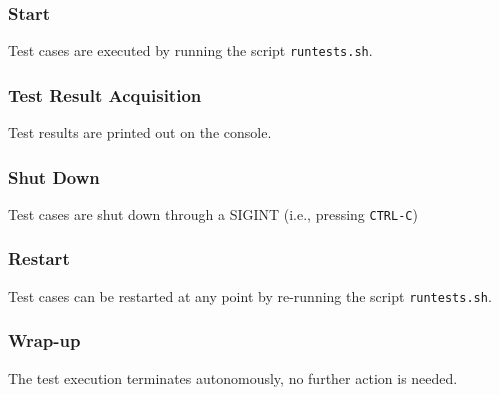 \subsubsection{Start}
Test cases are executed by running the script \texttt{runtests.sh}.
\subsubsection{Test Result Acquisition}
Test results are printed out on the console.
\subsubsection{Shut Down}
Test cases are shut down through a SIGINT (i.e., pressing \texttt{CTRL-C})
\subsubsection{Restart}
Test cases can be restarted at any point by re-running the script \texttt{runtests.sh}.
\subsubsection{Wrap-up}
The test execution terminates autonomously, no further action is needed.
